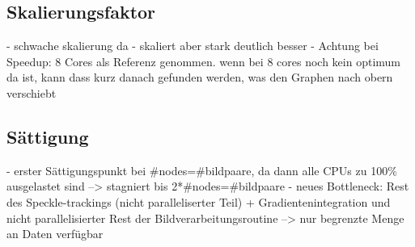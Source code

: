 \subsection{Skalierungsfaktor}

\begin{correctme}
	- schwache skalierung da
	- skaliert aber stark deutlich besser
	- Achtung bei Speedup: 8 Cores als Referenz genommen. wenn bei 8 cores noch kein optimum da ist, kann dass kurz danach gefunden werden, was den Graphen nach obern verschiebt
\end{correctme}

\subsection{Sättigung}

\begin{correctmore}
	- erster Sättigungspunkt bei \#nodes=\#bildpaare, da dann alle CPUs zu 100\% ausgelastet sind --> stagniert bis 2*\#nodes=\#bildpaare
	- neues Bottleneck: Rest des Speckle-trackings (nicht paralleliserter Teil) + Gradientenintegration und nicht parallelisierter Rest der Bildverarbeitungsroutine
	--> nur begrenzte Menge an Daten verfügbar
\end{correctmore}